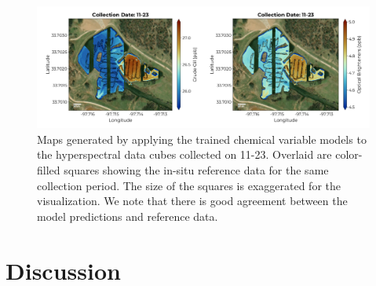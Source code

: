 \documentclass[remotesensing,article,submit,pdftex,moreauthors]{Definitions/mdpi}
\begin{document}
\begin{figure}
\centering
\vspace{-0.3in}
\includegraphics[width=\columnwidth]{paper/figures/results/maps/chemical.pdf}
\caption{Maps generated by applying the trained chemical variable models to the hyperspectral data cubes collected on 11-23. Overlaid are color-filled squares showing the in-situ reference data for the same collection period. The size of the squares is exaggerated for the visualization. We note that there is good agreement between the model predictions and reference data.\label{fig:map-chem}}
\end{figure}  




\section{Discussion} \label{sec:discussion}
\end{document}
